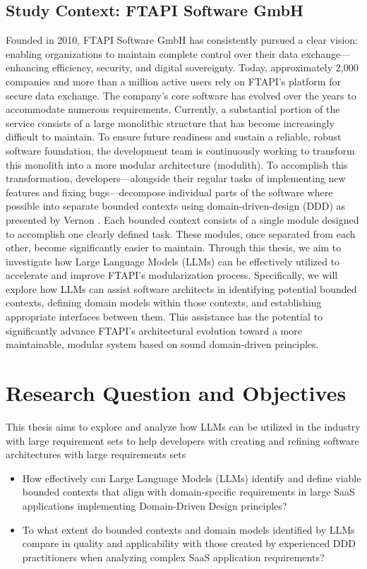 \documentclass[12pt,a4paper]{article}
\begin{document}
\subsection{Study Context: FTAPI Software GmbH}
Founded in 2010, FTAPI Software GmbH has consistently pursued a clear vision: enabling organizations to maintain complete control over their data exchange—enhancing efficiency, security, and digital sovereignty. Today, approximately 2,000 companies and more than a million active users rely on FTAPI's platform for secure data exchange.
The company's core software has evolved over the years to accommodate numerous requirements. Currently, a substantial portion of the service consists of a large monolithic structure that has become increasingly difficult to maintain. To ensure future readiness and sustain a reliable, robust software foundation, the development team is continuously working to transform this monolith into a more modular architecture (modulith).
To accomplish this transformation, developers—alongside their regular tasks of implementing new features and fixing bugs—decompose individual parts of the software where possible into separate bounded contexts using domain-driven-design (DDD) as presented by Vernon \autocite[p.62]{vernon2013implementing}. Each bounded context consists of a single module designed to accomplish one clearly defined task. These modules, once separated from each other, become significantly easier to maintain.
Through this thesis, we aim to investigate how Large Language Models (LLMs) can be effectively utilized to accelerate and improve FTAPI's modularization process. Specifically, we will explore how LLMs can assist software architects in identifying potential bounded contexts, defining domain models within those contexts, and establishing appropriate interfaces between them. This assistance has the potential to significantly advance FTAPI's architectural evolution toward a more maintainable, modular system based on sound domain-driven principles.

\section{Research Question and Objectives}

This thesis aims to explore and analyze how LLMs can be utilized in the industry with large requirement sets to help developers with creating and refining software architectures with large requirements sets

\begin{itemize}
    \item How effectively can Large Language Models (LLMs) identify and define viable bounded contexts that align with domain-specific requirements in large SaaS applications implementing Domain-Driven Design principles?
    \item To what extent do bounded contexts and domain models identified by LLMs compare in quality and applicability with those created by experienced DDD practitioners when analyzing complex SaaS application requirements?
\end{itemize}
\end{document}
